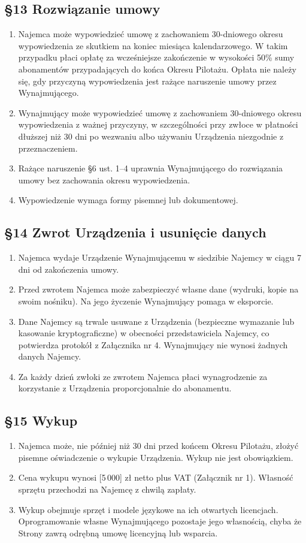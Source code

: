 \documentclass[11pt,a4paper]{article}
\begin{document}
\subsection*{§13 Rozwiązanie umowy}
\begin{enumerate}
\item Najemca może wypowiedzieć umowę z zachowaniem 30-dniowego okresu wypowiedzenia ze skutkiem na koniec miesiąca kalendarzowego. W takim przypadku płaci opłatę za wcześniejsze zakończenie w wysokości 50\% sumy abonamentów przypadających do końca Okresu Pilotażu. Opłata nie należy się, gdy przyczyną wypowiedzenia jest rażące naruszenie umowy przez Wynajmującego.
\item Wynajmujący może wypowiedzieć umowę z zachowaniem 30-dniowego okresu wypowiedzenia z ważnej przyczyny, w szczególności przy zwłoce w płatności dłuższej niż 30 dni po wezwaniu albo używaniu Urządzenia niezgodnie z przeznaczeniem.
\item Rażące naruszenie §6 ust. 1–4 uprawnia Wynajmującego do rozwiązania umowy bez zachowania okresu wypowiedzenia.
\item Wypowiedzenie wymaga formy pisemnej lub dokumentowej.
\end{enumerate}

\subsection*{§14 Zwrot Urządzenia i usunięcie danych}
\begin{enumerate}
\item Najemca wydaje Urządzenie Wynajmującemu w siedzibie Najemcy w ciągu 7 dni od zakończenia umowy.
\item Przed zwrotem Najemca może zabezpieczyć własne dane (wydruki, kopie na swoim nośniku). Na jego życzenie Wynajmujący pomaga w eksporcie.
\item Dane Najemcy są trwale usuwane z Urządzenia (bezpieczne wymazanie lub kasowanie kryptograficzne) w obecności przedstawiciela Najemcy, co potwierdza protokół z Załącznika nr 4. Wynajmujący nie wynosi żadnych danych Najemcy.
\item Za każdy dzień zwłoki ze zwrotem Najemca płaci wynagrodzenie za korzystanie z Urządzenia proporcjonalnie do abonamentu.
\end{enumerate}

\subsection*{§15 Wykup}
\begin{enumerate}
\item Najemca może, nie później niż 30 dni przed końcem Okresu Pilotażu, złożyć pisemne oświadczenie o wykupie Urządzenia. Wykup nie jest obowiązkiem.
\item Cena wykupu wynosi [5\,000] zł netto plus VAT (Załącznik nr 1). Własność sprzętu przechodzi na Najemcę z chwilą zapłaty.
\item Wykup obejmuje sprzęt i modele językowe na ich otwartych licencjach. Oprogramowanie własne Wynajmującego pozostaje jego własnością, chyba że Strony zawrą odrębną umowę licencyjną lub wsparcia.
\end{enumerate}
\end{document}
